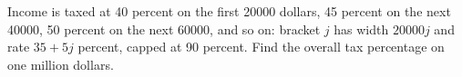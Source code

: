 Income is taxed at 40 percent on the first 20000 dollars, 45 percent on the next 40000, 50 percent on the next 60000, and so on: bracket $ j $ has width $ 20000j $ and rate $ 35+5j $ percent, capped at 90 percent. Find the overall tax percentage on one million dollars.
